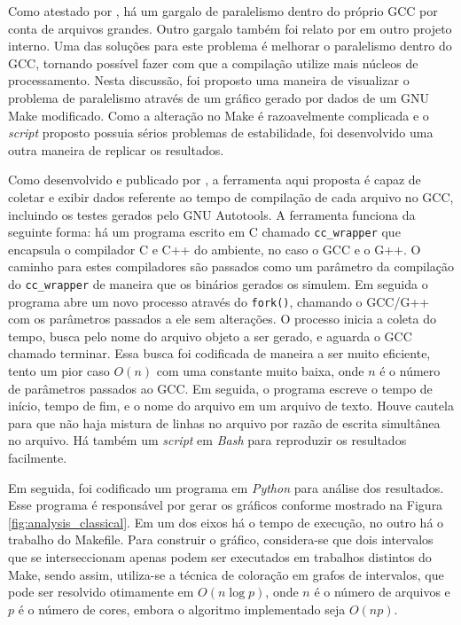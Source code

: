 Como atestado por \cite{PR84402}, há um gargalo de paralelismo dentro do
próprio GCC por conta de arquivos grandes. Outro gargalo também
foi relato por \cite{mailgcc} em outro projeto interno. Uma das soluções para este
problema é melhorar o paralelismo dentro do GCC, tornando possível fazer
com que a compilação utilize mais núcleos de processamento.
Nesta discussão, foi proposto uma maneira de visualizar o problema de
paralelismo através de um gráfico gerado por dados de um GNU Make modificado.
Como a alteração no Make é razoavelmente complicada e o \textit{script} proposto
possuia sérios problemas de estabilidade, foi desenvolvido uma outra maneira
de replicar os resultados.

Como desenvolvido e publicado por \cite{gcctimer}, a ferramenta aqui proposta
é capaz de coletar e exibir dados referente ao tempo de compilação
de cada arquivo no GCC, incluindo os testes gerados pelo GNU Autotools.
A ferramenta funciona da seguinte forma: há um programa escrito em C chamado
\texttt{cc\_wrapper} que encapsula o compilador C e C++ do ambiente, no caso o 
GCC e o G++. O caminho para estes compiladores são passados como um parâmetro
da compilação do \texttt{cc\_wrapper} de maneira que os binários gerados os
simulem. Em seguida o programa abre um novo processo através do \texttt{fork()},
chamando o GCC/G++ com os parâmetros passados a ele sem alterações. O processo
inicia a coleta do tempo, busca pelo nome do arquivo objeto a ser gerado, e
aguarda o GCC chamado terminar. Essa busca foi codificada de maneira a ser
muito eficiente, tento um pior caso $O(n)$ com uma constante muito baixa,
onde $n$ é o número de parâmetros passados ao GCC. Em seguida, o programa
escreve o tempo de início, tempo de fim, e o nome do arquivo em um arquivo
de texto. Houve cautela para que não haja mistura de linhas
no arquivo por razão de escrita simultânea no arquivo. Há também um \textit{script}
em \textit{Bash} para reproduzir os resultados facilmente.

Em seguida, foi codificado um programa em \textit{Python} para análise dos
resultados. Esse programa é responsável por gerar os gráficos conforme
mostrado na Figura \ref{fig:analysis_classical}. Em um dos eixos há o
tempo de execução, no outro há
o trabalho do Makefile. Para construir o gráfico, considera-se que
dois intervalos que se interseccionam apenas podem ser executados em
trabalhos distintos do Make, sendo assim, utiliza-se a técnica
de coloração em grafos de intervalos, que pode ser resolvido otimamente
em $O(n \log p)$, onde $n$ é o número de arquivos e $p$ é o número de
cores, embora o algoritmo
implementado seja $O(np)$.


